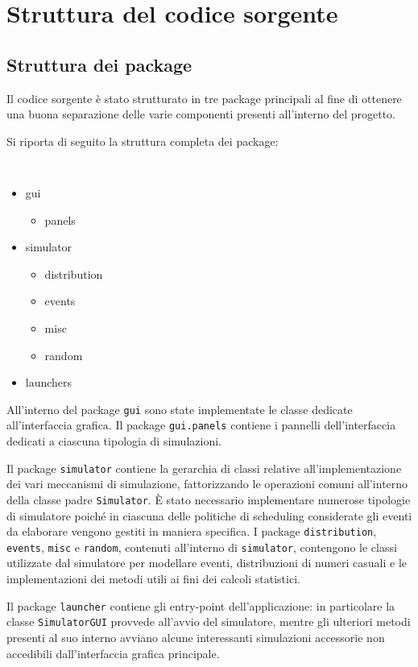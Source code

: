 \chapter{Struttura del codice sorgente}
\label{ch:optional}

\section{Struttura dei package}

Il codice sorgente \`e stato strutturato in tre package principali al fine di ottenere una buona separazione delle varie componenti presenti all'interno del progetto.

Si riporta di seguito la struttura completa dei package:

{\tt
\begin{itemize}
\item[\textbullet] gui
	\begin{itemize}
		\item[\textbullet] panels
	\end{itemize}
\item[\textbullet] simulator
	\begin{itemize}
		\item[\textbullet] distribution
		\item[\textbullet] events
		\item[\textbullet] misc
		\item[\textbullet] random
	\end{itemize}
\item[\textbullet] launchers
\end{itemize}
}

All'interno del package {\tt gui} sono state implementate le classe dedicate all'interfaccia grafica. Il package {\tt gui.panels} contiene i pannelli dell'interfaccia dedicati a ciascuna tipologia di simulazioni.

Il package {\tt simulator} contiene la gerarchia di classi relative all'implementazione dei vari meccanismi di simulazione, fattorizzando le operazioni comuni all'interno della classe padre {\tt Simulator}.
\`E stato necessario implementare numerose tipologie di simulatore poich\'e in ciascuna delle politiche di scheduling considerate gli eventi da elaborare vengono gestiti in maniera specifica.
I package {\tt distribution}, {\tt events}, {\tt misc} e {\tt random}, contenuti all'interno di {\tt simulator}, contengono le classi utilizzate dal simulatore per modellare eventi, distribuzioni di numeri casuali e le implementazioni dei metodi utili ai fini dei calcoli statistici.

Il package {\tt launcher} contiene gli entry-point dell'applicazione: in particolare la classe {\tt SimulatorGUI} provvede all'avvio del simulatore, mentre gli ulteriori metodi presenti al suo interno avviano alcune interessanti simulazioni accessorie non accedibili dall'interfaccia grafica principale.
